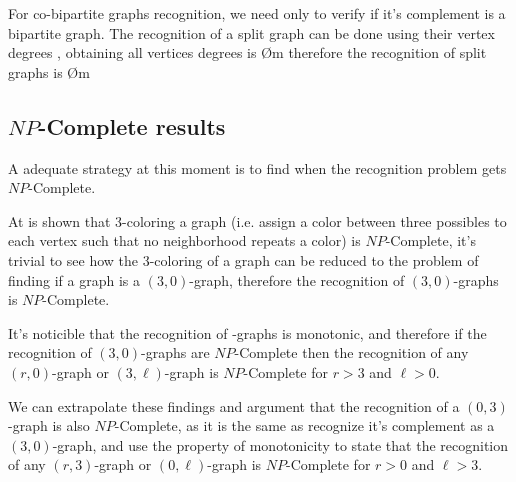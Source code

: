 For co-bipartite graphs recognition, we need only to verify if it's complement is a bipartite graph. The recognition of a split graph can be done using their vertex degrees \cite{??}, obtaining all vertices degrees is \O{m} therefore the recognition of split graphs is \O{m}

\subsection{$NP$-Complete results}

A adequate strategy at this moment is to find when the recognition problem gets $NP$-Complete.

At \cite{gareyjohnson} is shown that 3-coloring a graph (i.e. assign a color between three possibles to each vertex such that no neighborhood repeats a color) is $NP$-Complete, it's trivial to see how the 3-coloring of a graph can be reduced to the problem of finding if a graph is a $(3,0)$-graph, therefore the recognition of $(3,0)$-graphs is $NP$-Complete.

It's noticible that the recognition of \RL-graphs is monotonic, and therefore if the recognition of $(3,0)$-graphs are $NP$-Complete then the recognition of any $(r,0)$-graph or $(3,\ell)$-graph is $NP$-Complete for $r > 3$ and $\ell >0$.

We can extrapolate these findings and argument that the recognition of a $(0,3)$-graph is also $NP$-Complete, as it is the same as recognize it's complement as a $(3,0)$-graph, and use the property of monotonicity to state that the recognition of any $(r,3)$-graph or $(0,\ell)$-graph is $NP$-Complete for $r > 0$ and $\ell >3$.

